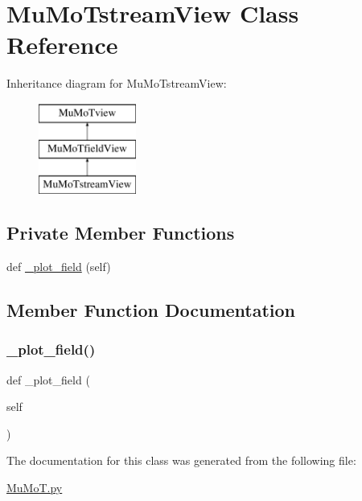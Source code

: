 \hypertarget{class_mu_mo_t_1_1_mu_mo_tstream_view}{}\section{Mu\+Mo\+Tstream\+View Class Reference}
\label{class_mu_mo_t_1_1_mu_mo_tstream_view}
Inheritance diagram for Mu\+Mo\+Tstream\+View\+:\begin{figure}[H]
\begin{center}
\leavevmode
\includegraphics[height=3.000000cm]{class_mu_mo_t_1_1_mu_mo_tstream_view}
\end{center}
\end{figure}
\subsection*{Private Member Functions}
\begin{DoxyCompactItemize}
\item 
def \hyperlink{class_mu_mo_t_1_1_mu_mo_tstream_view_a50d59419298116f738a98c864afb9d89}{\+\_\+plot\+\_\+field} (self)
\end{DoxyCompactItemize}


\subsection{Member Function Documentation}
\mbox{\label{class_mu_mo_t_1_1_mu_mo_tstream_view_a50d59419298116f738a98c864afb9d89}} 
\subsubsection{\texorpdfstring{\+\_\+plot\+\_\+field()}{\_plot\_field()}}
{\footnotesize\ttfamily def \+\_\+plot\+\_\+field (\begin{DoxyParamCaption}\item[{}]{self }\end{DoxyParamCaption})\hspace{0.3cm}{\ttfamily [private]}}



The documentation for this class was generated from the following file\+:\begin{DoxyCompactItemize}
\item 
\hyperlink{_mu_mo_t_8py}{Mu\+Mo\+T.\+py}\end{DoxyCompactItemize}
